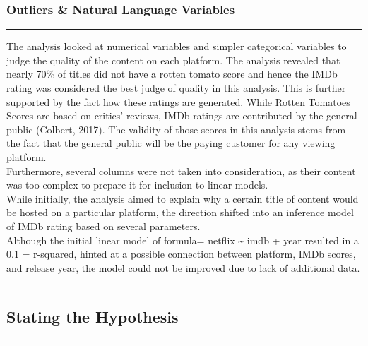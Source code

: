 \documentclass[
]{article}
\begin{document}
\hypertarget{outliers-natural-language-variables}{%
\subsubsection{Outliers \& Natural Language
Variables}\label{outliers-natural-language-variables}}

\begin{center}\rule{0.5\linewidth}{0.5pt}\end{center}

The analysis looked at numerical variables and simpler categorical
variables to judge the quality of the content on each platform. The
analysis revealed that nearly 70\% of titles did not have a rotten
tomato score and hence the IMDb rating was considered the best judge of
quality in this analysis. This is further supported by the fact how
these ratings are generated. While Rotten Tomatoes Scores are based on
critics' reviews, IMDb ratings are contributed by the general public
(Colbert, 2017). The validity of those scores in this analysis stems
from the fact that the general public will be the paying customer for
any viewing platform.\\
Furthermore, several columns were not taken into consideration, as their
content was too complex to prepare it for inclusion to linear models.\\
While initially, the analysis aimed to explain why a certain title of
content would be hosted on a particular platform, the direction shifted
into an inference model of IMDb rating based on several parameters.\\
Although the initial linear model of formula= netflix \textasciitilde{}
imdb + year resulted in a 0.1 = r-squared, hinted at a possible
connection between platform, IMDb scores, and release year, the model
could not be improved due to lack of additional data.

\begin{center}\rule{0.5\linewidth}{0.5pt}\end{center}

\hypertarget{stating-the-hypothesis}{%
\subsection{Stating the Hypothesis}\label{stating-the-hypothesis}}

\begin{center}\rule{0.5\linewidth}{0.5pt}\end{center}
\end{document}
